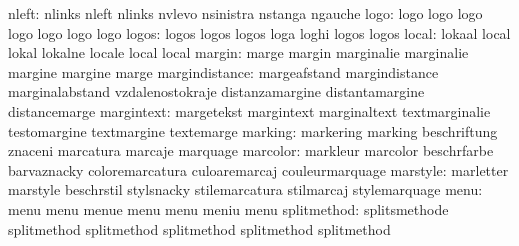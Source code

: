                     nleft: nlinks                    nleft
                           nlinks                    nvlevo
                           nsinistra                 nstanga
                           ngauche
                     logo: logo                      logo
                           logo                      logo
                           logo                      logo
                           logo
                    logos: logos                     logos
                           logos                     loga
                           loghi                     logos
                           logos
                    local: lokaal                    local
                           lokal                     lokalne
                           locale                    local
                           local
                   margin: marge                     margin
                           marginalie                marginalie
                           margine                   margine
                           marge
           margindistance: margeafstand              margindistance
                           marginalabstand           vzdalenostokraje
                           distanzamargine           distantamargine
                           distancemarge
               margintext: margetekst                margintext
                           marginaltext              textmarginalie
                           testomargine              textmargine
                           textemarge
                  marking: markering                 marking
                           beschriftung              znaceni
                           marcatura                 marcaje
                           marquage
                 marcolor: markleur                  marcolor
                           beschrfarbe               barvaznacky
                           coloremarcatura           culoaremarcaj
                           couleurmarquage
                 marstyle: marletter                 marstyle
                           beschrstil                stylsnacky
                           stilemarcatura            stilmarcaj
                           stylemarquage
                     menu: menu                      menu
                           menue                     menu
                           menu                      meniu
                           menu
              splitmethod: splitsmethode             splitmethod
                           splitmethod               splitmethod
                           splitmethod               splitmethod
